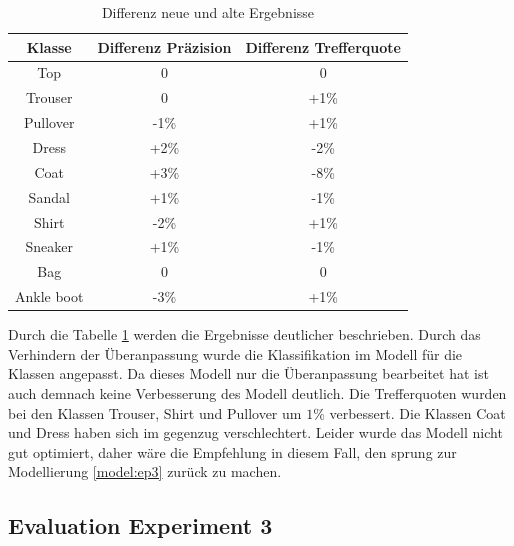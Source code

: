 \documentclass[12pt]{scrreprt}
\begin{document}
\begin{table}[h!]
	\begin{center}
		\begin{tabular}{|c|c|c|}
			\hline
			Klasse & Differenz Präzision & Differenz Trefferquote \\
			\hline
			Top  & 0 & 0\\
			\hline
			Trouser  & 0 & +1\%  \\
			\hline
			Pullover   & -1\% & +1\% \\
			\hline
			Dress   & +2\% & -2\% \\
			\hline
			Coat   & +3\% & -8\% \\
			\hline
			Sandal & +1\% & -1\% \\
			\hline
			Shirt & -2\% & +1\% \\
			\hline
			Sneaker & +1\% & -1\% \\
			\hline
			Bag & 0 & 0 \\
			\hline
			Ankle boot & -3\% & +1\% \\
			\hline
		\end{tabular}
		\caption{Differenz neue und alte Ergebnisse}
		\label{tab:differenz}
	\end{center}
\end{table}
\newpage

Durch die Tabelle \ref{tab:differenz} werden die Ergebnisse deutlicher beschrieben. Durch das Verhindern der Überanpassung wurde die Klassifikation im Modell für die Klassen angepasst. Da dieses Modell nur die Überanpassung bearbeitet hat ist auch demnach keine Verbesserung des Modell deutlich. Die Trefferquoten wurden bei den Klassen Trouser, Shirt und Pullover um $1\%$ verbessert. Die Klassen Coat und Dress haben sich im gegenzug verschlechtert. Leider wurde das Modell nicht gut optimiert, daher wäre die Empfehlung in diesem Fall, den sprung zur Modellierung \ref{model:ep3} zurück zu machen. 

\subsection{Evaluation Experiment 3}\label{eval:eval3}
\end{document}
